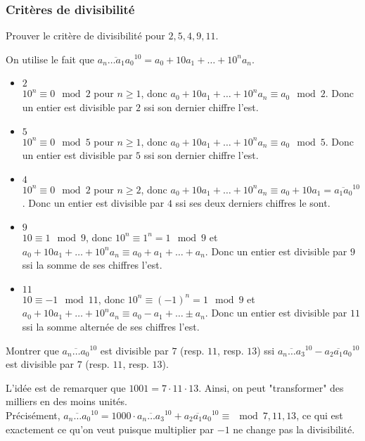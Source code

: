 \subsubsection{Critères de divisibilité}

\begin{exo}
Prouver le critère de divisibilité pour $2, 5, 4, 9, 11$.
\end{exo}
\begin{sol}
On utilise le fait que $\overline{a_n\dots a_1a_0}^{10} = a_0 + 10a_1 + \dots + 10^na_n$.
\begin{itemize}
    \item $2$ \\
    $10^n \equiv 0 \mod 2$ pour $n\ge 1$, donc $a_0 + 10a_1 + \dots + 10^na_n \equiv a_0 \mod 2$. Donc un entier est divisible par $2$ ssi son dernier chiffre l'est.
    \item $5$ \\
    $10^n \equiv 0 \mod 5$ pour $n\ge 1$, donc $a_0 + 10a_1 + \dots + 10^na_n \equiv a_0 \mod 5$. Donc un entier est divisible par $5$ ssi son dernier chiffre l'est.
    \item $4$ \\
    $10^n \equiv 0 \mod 2$ pour $n\ge 2$, donc $a_0 + 10a_1 + \dots + 10^na_n \equiv a_0 + 10a_1 = \overline{a_1a_0}^{10}$. Donc un entier est divisible par $4$ ssi ses deux derniers chiffres le sont.
    \item $9$ \\
    $10 \equiv 1 \mod 9$, donc $10^n \equiv 1^n = 1 \mod 9$ et $a_0 + 10a_1 + \dots + 10^na_n \equiv a_0 + a_1 + \dots + a_n$. Donc un entier est divisible par $9$ ssi la somme de ses chiffres l'est.
    \item $11$ \\
    $10 \equiv -1 \mod 11$, donc $10^n \equiv (-1)^n = 1 \mod 9$ et $a_0 + 10a_1 + \dots + 10^na_n \equiv a_0 - a_1 + \dots \pm a_n$. Donc un entier est divisible par $11$ ssi la somme alternée de ses chiffres l'est.
\end{itemize}
\end{sol}

\begin{exo}
Montrer que $\overline{a_n\dots a_0}^{10}$ est divisible par $7$ (resp. $11$, resp. $13$) ssi $\overline{a_n\dots a_3}^{10} - \overline{a_2a_1a_0}^{10}$ est divisible par $7$ (resp. $11$, resp. $13$).
\end{exo}
\begin{sol}
L'idée est de remarquer que $1001 = 7 \cdot 11 \cdot 13$. Ainsi, on peut "transformer" des milliers en des moins unités. \\

Précisément, $\overline{a_n\dots a_0}^{10} = 1000\cdot\overline{a_n\dots a_3}^{10} + \overline{a_2a_1a_0}^{10} \equiv \mod 7, 11, 13$, ce qui est exactement ce qu'on veut puisque multiplier par $-1$ ne change pas la divisibilité.
\end{sol}

